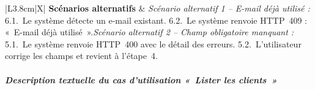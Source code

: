 \begin{table}[H]
\begin{tabularx}{\textwidth}{|L{3.8cm}|X|}
    \textbf{Scénarios alternatifs} &
    \textit{Scénario alternatif 1 -- E-mail déjà utilisé :}\newline
    \hspace*{6pt}6.1.~Le système détecte un e-mail existant.\newline
    \hspace*{6pt}6.2.~Le système renvoie HTTP~409 : «~E-mail déjà utilisé~».\newline[2pt]
    \textit{Scénario alternatif 2 -- Champ obligatoire manquant :}\newline
    \hspace*{6pt}5.1.~Le système renvoie HTTP~400 avec le détail des erreurs.\newline
    \hspace*{6pt}5.2.~L'utilisateur corrige les champs et revient à l'étape~4.\\
    \hline
  \end{tabularx}
\end{table}

\subparagraph{Description textuelle du cas d'utilisation «~Lister les clients~»}

